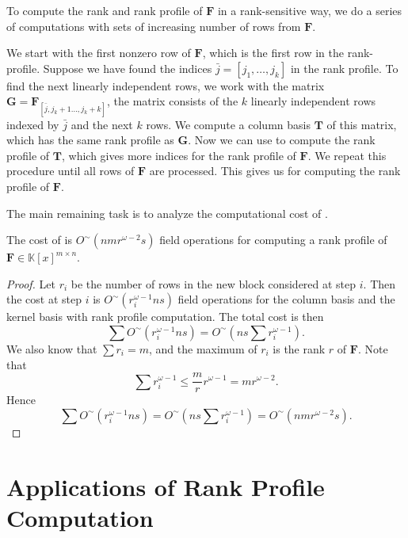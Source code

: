 To compute the rank and rank profile of $\mathbf{F}$ in a rank-sensitive
way, we do a series of computations with sets of increasing number
of rows from $\mathbf{F}$.

We start with the first nonzero row of $\mathbf{F}$, which is the
first row in the rank-profile. Suppose we have found the indices
$\bar{j}=\left[j_{1},\dots,j_{k}\right]$ in the rank profile. To
find the next linearly independent rows, we work with the matrix $\mathbf{G}=\mathbf{F}_{\left[\bar{j},j_{k}+1\dots,j_{k}+k\right]}$,
the matrix consists of the $k$ linearly independent rows indexed
by $\bar{j}$ and the next $k$ rows. We compute a column basis $\mathbf{T}$
of this matrix, which has the same rank profile as $\mathbf{G}$.
Now we can use 
to compute the rank profile of $\mathbf{T}$, which gives more indices
for the rank profile of $\mathbf{F}$. We repeat this procedure until
all rows of $\mathbf{F}$ are processed. This gives us 
for computing the rank profile of $\mathbf{F}$.



The main remaining task is to analyze the computational cost of . 
\begin{thm}
The cost of  is $O^{\sim}\left(nmr^{\omega-2}s\right)$
field operations for computing a rank profile of $\mathbf{F}\in\mathbb{K}\left[x\right]^{m\times n}$.\end{thm}
\begin{proof}
Let $r_{i}$ be the number of rows in the new block considered at
step $i$. Then the cost at step $i$ is $O^{\sim}\left(r_{i}^{\omega-1}ns\right)$
field operations for the column basis and the kernel basis with rank
profile computation. The total cost is then 
\[
\sum O^{\sim}\left(r_{i}^{\omega-1}ns\right)=O^{\sim}\left(ns\sum r_{i}^{\omega-1}\right).
\]
 We also know that $\sum r_{i}=m$, and the maximum of $r_{i}$ is
the rank $r$ of $\mathbf{F}$. Note that 
\[
\sum r_{i}^{\omega-1}\le\frac{m}{r}r^{\omega-1}=mr^{\omega-2}.
\]
 Hence 
\[
\sum O^{\sim}\left(r_{i}^{\omega-1}ns\right)=O^{\sim}\left(ns\sum r_{i}^{\omega-1}\right)=O^{\sim}\left(nmr^{\omega-2}s\right).
\]

\end{proof}

\section{Applications of Rank Profile Computation}


